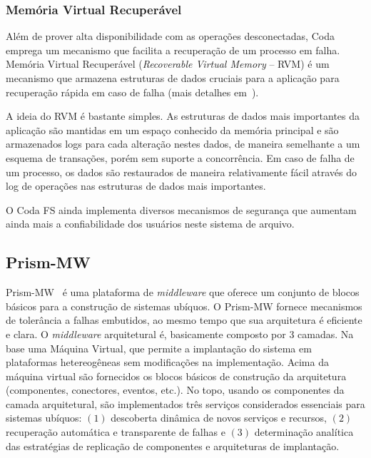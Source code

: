 \subsubsection*{Memória Virtual Recuperável}
Além de prover alta disponibilidade com as operações desconectadas, Coda emprega um mecanismo que facilita a recuperação de um processo em falha. Memória Virtual Recuperável (\emph{Recoverable Virtual Memory} -- RVM) é um mecanismo que armazena estruturas de dados cruciais para a aplicação para recuperação rápida em caso de falha (mais detalhes em~\cite{satyanarayanan1994lightweight}).

A ideia do RVM é bastante simples. As estruturas de dados mais importantes da aplicação são mantidas em um espaço conhecido da memória principal e são armazenados logs para cada alteração nestes dados, de maneira semelhante a um esquema de transações, porém sem suporte a concorrência. Em caso de falha de um processo, os dados são restaurados de maneira relativamente fácil através do log de operações nas estruturas de dados mais importantes.

O Coda FS ainda implementa diversos mecanismos de segurança que aumentam ainda mais a confiabilidade dos usuários neste sistema de arquivo.


\subsection{Prism-MW} %
\label{sub:prism_mw}

Prism-MW~\cite{Seo07} é uma plataforma de \emph{middleware} que oferece um conjunto de blocos básicos para a construção de sistemas ubíquos. O Prism-MW fornece mecanismos de tolerância a falhas embutidos, ao mesmo tempo que sua arquitetura é eficiente e clara. O \emph{middleware} arquitetural é, basicamente composto por 3 camadas. Na base uma Máquina Virtual, que permite a implantação do sistema em plataformas hetereogêneas sem modificações na implementação. Acima da máquina virtual são fornecidos os blocos básicos de construção da arquitetura (componentes, conectores, eventos, etc.). No topo, usando os componentes da camada arquitetural, são implementados três serviços considerados essenciais para sistemas ubíquos: $(1)$ descoberta dinâmica de novos serviços e recursos, $(2)$ recuperação automática e transparente de falhas e $(3)$ determinação analítica das estratégias de replicação de componentes e arquiteturas de implantação.

